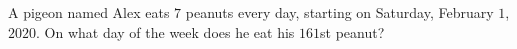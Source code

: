 A pigeon named Alex eats $7$ peanuts every day, starting on Saturday, February $1$, $2020$. On what day of the week does he eat his $161$st peanut?
